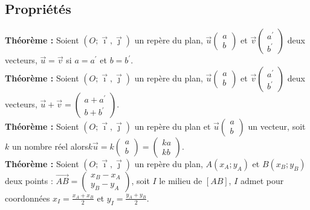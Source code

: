 \documentclass[a4paper,titlepage]{article}
\begin{document}
    \subsection{Propriétés}
        \textbf{Théorème :} Soient $\left(O;\vec{\imath},\vec{\jmath}\right)$ un repère du plan, $\vec{u}\left(\begin{smallmatrix}a\\b\end{smallmatrix}\right)$ et $\vec{v}\left(\begin{smallmatrix}a^{\prime}\\b^{\prime}\end{smallmatrix}\right)$ deux vecteurs, $\vec{u}=\vec{v}$ si $a=a^{\prime}$ et $b=b^{\prime}$.
        \\
        \textbf{Théorème :} Soient $\left(O;\vec{\imath},\vec{\jmath}\right)$ un repère du plan, $\vec{u}\left(\begin{smallmatrix}a\\b\end{smallmatrix}\right)$ et $\vec{v}\left(\begin{smallmatrix}a^{\prime}\\b^{\prime}\end{smallmatrix}\right)$ deux vecteurs, $\vec{u}+\vec{v}=\left(\begin{smallmatrix}a+a^{\prime}\\b+b^{\prime}\end{smallmatrix}\right)$.
        \\
        \textbf{Théorème :} Soient $\left(O;\vec{\imath},\vec{\jmath}\right)$ un repère du plan et $\vec{u}\left(\begin{smallmatrix}a\\b\end{smallmatrix}\right)$ un vecteur, soit $k$ un nombre réel alors\linebreak$k\vec{u}=k\left(\begin{smallmatrix}a\\b\end{smallmatrix}\right)=\left(\begin{smallmatrix}ka\\kb\end{smallmatrix}\right)$.
        \\
        \textbf{Théorème :} Soient $\left(O;\vec{\imath},\vec{\jmath}\right)$ un repère du plan, $A\left(x_{A};y_{A}\right)$ et $B\left(x_{B};y_{B}\right)$ deux points : $\overrightarrow{AB}=\left(\begin{smallmatrix}x_{B}-x_{A}\\y_{B}-y_{A}\end{smallmatrix}\right)$, soit $I$ le milieu de $\left[AB\right]$, $I$ admet pour coordonnées $x_{I}=\frac{x_{A}+x_{B}}{2}$ et $y_{I}=\frac{y_{A}+y_{B}}{2}$.
\end{document}
